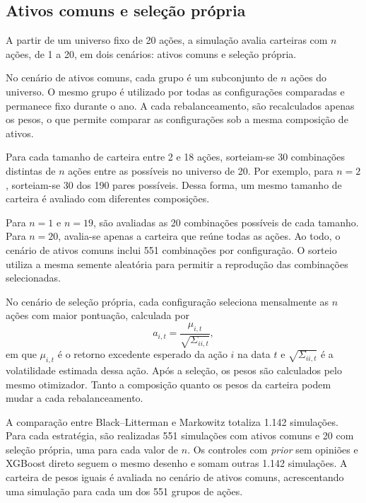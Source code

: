 \subsection{Ativos comuns e seleção própria}

A partir de um universo fixo de 20 ações, a simulação
avalia carteiras com $n$ ações, de 1 a 20, em dois
cenários: ativos comuns e seleção própria.

No cenário de ativos comuns, cada grupo é um subconjunto
de $n$ ações do universo. O mesmo grupo é utilizado por
todas as configurações comparadas e permanece fixo durante
o ano. A cada rebalanceamento, são recalculados apenas os
pesos, o que permite comparar as configurações sob a mesma
composição de ativos.

Para cada tamanho de carteira entre 2 e 18 ações,
sorteiam-se 30 combinações distintas de $n$ ações entre
as possíveis no universo de 20. Por exemplo, para $n=2$,
sorteiam-se 30 dos 190 pares possíveis. Dessa forma,
um mesmo tamanho de carteira é avaliado com diferentes
composições.

Para $n=1$ e $n=19$, são avaliadas as 20 combinações
possíveis de cada tamanho. Para $n=20$, avalia-se apenas
a carteira que reúne todas as ações. Ao todo, o cenário
de ativos comuns inclui 551 combinações por configuração.
O sorteio utiliza a mesma semente aleatória para permitir a
reprodução das combinações selecionadas.

No cenário de seleção própria, cada configuração
seleciona mensalmente as $n$ ações com maior pontuação,
calculada por
\begin{equation}
    a_{i,t}
    =
    \frac{\mu_{i,t}}{\sqrt{\Sigma_{ii,t}}},
    \label{eq:ranking_selecao}
\end{equation}
em que $\mu_{i,t}$ é o retorno excedente esperado da
ação $i$ na data $t$ e $\sqrt{\Sigma_{ii,t}}$ é a
volatilidade estimada dessa ação. Após a seleção,
os pesos são calculados pelo mesmo otimizador. Tanto
a composição quanto os pesos da carteira podem mudar
a cada rebalanceamento.

A comparação entre Black--Litterman e Markowitz totaliza
1.142 simulações. Para cada estratégia, são realizadas
551 simulações com ativos comuns e 20 com seleção própria,
uma para cada valor de $n$. Os controles com \emph{prior}
sem opiniões e XGBoost direto seguem o mesmo desenho e
somam outras 1.142 simulações. A carteira de pesos iguais
é avaliada no cenário de ativos comuns, acrescentando
uma simulação para cada um dos 551 grupos de ações.

